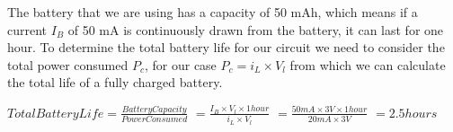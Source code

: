 The battery that we are using has a capacity of 50 mAh, which means if a current $I_B$ of 50 mA  is continuously drawn from the battery, it can last for one hour. To determine the total battery life for our circuit we need to consider the total power consumed $P_c$, for our case $P_c = i_L \times V_l $ from which we can calculate the total life of a fully charged battery.

\begin{center}
 $Total Battery Life = \frac{Battery Capacity}{Power Consumed}$
                    $= \frac{I_B \times V_l \times 1 hour}{i_L \times V_l}$
                    $= \frac{50mA \times 3V \times 1 hour}{20mA \times 3V}$
                    $= 2.5 hours$
\end{center}